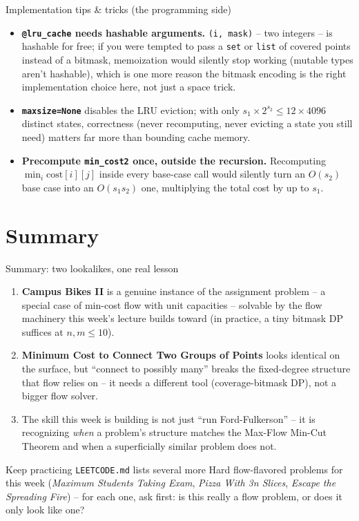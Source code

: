 \documentclass[11pt,aspectratio=169]{beamer}
\begin{document}
\begin{frame}{Implementation tips \& tricks (the programming side)}
  \small
  \begin{itemize}
    \item \textbf{\texttt{@lru\_cache} needs hashable arguments.} \texttt{(i, mask)} --
    two integers -- is hashable for free; if you were tempted to pass a \texttt{set} or
    \texttt{list} of covered points instead of a bitmask, memoization would silently
    stop working (mutable types aren't hashable), which is one more reason the bitmask
    encoding is the right implementation choice here, not just a space trick.
    \item \textbf{\texttt{maxsize=None}} disables the LRU eviction; with only
    $s_1\times2^{s_2}\le 12\times4096$ distinct states, correctness (never recomputing,
    never evicting a state you still need) matters far more than bounding cache memory.
    \item \textbf{Precompute \texttt{min\_cost2} once, outside the recursion.}
    Recomputing $\min_i \text{cost}[i][j]$ inside every base-case call would silently
    turn an $O(s_2)$ base case into an $O(s_1 s_2)$ one, multiplying the total cost by
    up to $s_1$.
  \end{itemize}
\end{frame}

\section{Summary}

\begin{frame}{Summary: two lookalikes, one real lesson}
  \footnotesize
  \begin{enumerate}
    \item \textbf{Campus Bikes II} is a genuine instance of the assignment problem --
    a special case of min-cost flow with unit capacities -- solvable by the flow
    machinery this week's lecture builds toward (in practice, a tiny bitmask DP suffices
    at $n,m\le10$).
    \item \textbf{Minimum Cost to Connect Two Groups of Points} looks identical on the
    surface, but ``connect to possibly many'' breaks the fixed-degree structure that
    flow relies on -- it needs a different tool (coverage-bitmask DP), not a bigger
    flow solver.
    \item The skill this week is building is not just ``run Ford-Fulkerson'' -- it is
    recognizing \emph{when} a problem's structure matches the Max-Flow Min-Cut Theorem
    and when a superficially similar problem does not.
  \end{enumerate}
  \begin{alertblock}{Keep practicing}
    \texttt{LEETCODE.md} lists several more Hard flow-flavored problems for this week
    (\emph{Maximum Students Taking Exam}, \emph{Pizza With 3n Slices}, \emph{Escape the
    Spreading Fire}) -- for each one, ask first: is this really a flow problem, or does
    it only look like one?
  \end{alertblock}
\end{frame}
\end{document}
